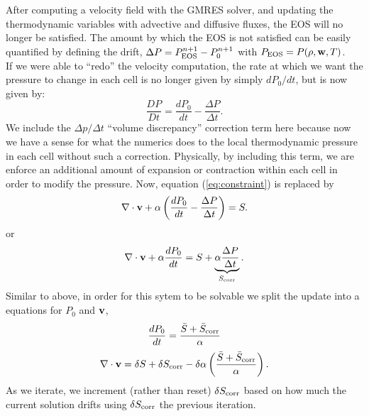 \documentclass[final]{siamltex}
\def\vb {{\bf v}}
\def\wb {{\bf w}}
\begin{document}
After computing a velocity field with the GMRES solver, and updating the thermodynamic
variables with advective and diffusive fluxes, the EOS will no longer be satisfied.
The amount by which the EOS is not satisfied can be easily quantified by defining
the drift, $\Delta P = P_{\rm EOS}^{n+1} - P_0^{n+1}$ with $P_{\rm EOS} = P(\rho,\wb,T)$.\\

If we were able to ``redo'' the velocity computation, the rate at which we want the 
pressure to change in each cell is no longer given
by simply $dP_0/dt$, but is now given by:
\begin{equation}
\frac{DP}{Dt} = \frac{dP_0}{dt} - \frac{\Delta P}{\Delta t}.
\end{equation}
We include the $\Delta p/\Delta t$ ``volume discrepancy'' correction term here because 
now we have a sense for what the numerics does to the local thermodynamic pressure in 
each cell without such a correction.  Physically, by including this term, we are enforce 
an additional amount of expansion or contraction within each cell in order to modify 
the pressure.  Now, equation (\ref{eq:constraint}) is replaced by
\begin{equation}
\nabla\cdot\vb + \alpha\left(\frac{dP_0}{dt} - \frac{\Delta P}{\Delta t}\right) = S.
\end{equation}
or
\begin{equation}
\nabla\cdot\vb + \alpha\frac{dP_0}{dt} = S + \underbrace{\alpha\frac{\Delta P}{\Delta t}}_{S_{\rm corr}}.
\end{equation}
Similar to above, in order for this sytem to be solvable we split the update into a
equations for $P_0$ and $\vb$,
\begin{equation}
\frac{dP_0}{dt} = \frac{\bar{S} + \bar{S}_{\rm corr}}{\alpha}
\end{equation}
\begin{equation}
\nabla\cdot\vb = \delta S + \delta S_{\rm corr} - \delta\alpha\left(\frac{\bar{S} + \bar{S}_{\rm corr}}{\alpha}\right).
\end{equation}
As we iterate, we increment (rather than reset) $\delta S_{\rm corr}$ based on how much 
the current solution drifts using $\delta S_{\rm corr}$ the previous iteration.
\end{document}
